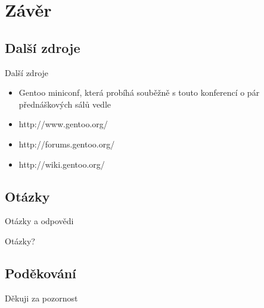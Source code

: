 \documentclass{beamer}
\begin{document}
\section{Závěr}

\subsection{Další zdroje}
\begin{frame}{Další zdroje}
	\begin{itemize}
		\item Gentoo miniconf, která probíhá souběžně s touto konferencí o pár přednáškových sálů vedle
		\item http://www.gentoo.org/
		\item http://forums.gentoo.org/
		\item http://wiki.gentoo.org/
	\end{itemize}
\end{frame}

\subsection{Otázky}
\begin{frame}{Otázky a odpovědi}
	\begin{center}Otázky?\end{center}
\end{frame}

\subsection{Poděkování}
\begin{frame}{}
	\begin{center}Děkuji za pozornost\end{center}
\end{frame}
\end{document}
